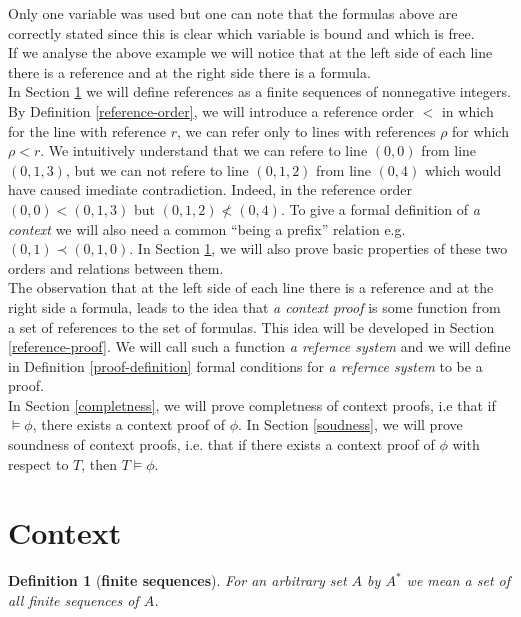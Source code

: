 \documentclass[10pt]{article}
\theoremstyle{plain}
\newtheorem{definition}[theorem]{Definition}
\begin{document}
Only one variable was used but one can note that the formulas above are correctly stated since this is clear which variable is bound and which is free.
\\

If we analyse the above example we will notice that at the left side of each line there is a reference and at the right side there is a formula. 
\\

In Section \ref{context} we will define references as a finite sequences of nonnegative integers. 
By Definition \ref{reference-order}, we will introduce a reference order $<$ in which for the line with reference $r$, we can refer only to lines with references $\rho$ for which $\rho < r$.
We intuitively understand that we can refere to line $(0, 0)$ from line $(0, 1, 3)$, but we can not refere to line $(0, 1, 2)$ from line $(0, 4)$ which would have caused imediate contradiction. Indeed, in the reference order 
$(0, 0) < (0, 1, 3)$ but $(0, 1, 2) \not< (0, 4)$.
To give a formal definition of \textit{a context} we will also need a common ``being a prefix'' relation e.g.
$(0, 1) \prec (0, 1, 0)$.
In Section \ref{context}, we will also prove basic properties of these two orders and relations between them.
\\

The observation that at the left side of each line there is a reference and at the right side a formula, leads to the idea that \textit{a context proof} is some function from a set of references to the set of formulas. This idea will be developed in Section \ref{reference-proof}. We will call such a function \textit{a refernce system} and we will define in Definition \ref{proof-definition} formal conditions for \textit{a refernce system} to be a proof.
\\

In Section \ref{completness}, we will prove completness of context proofs, i.e  that if $\models \phi$, there exists a context proof of $\phi$. In Section \ref{soudness}, we will prove soundness of context proofs, i.e. that if there exists a context proof of $\phi$ with respect to $T$, then $T\models \phi$.


\section{Context}
\label{context}

\begin{definition}[\textbf{finite sequences}]
For an arbitrary set $A$ by $A^*$ we mean a set of all finite sequences of $A$.
\end{definition}
\end{document}

